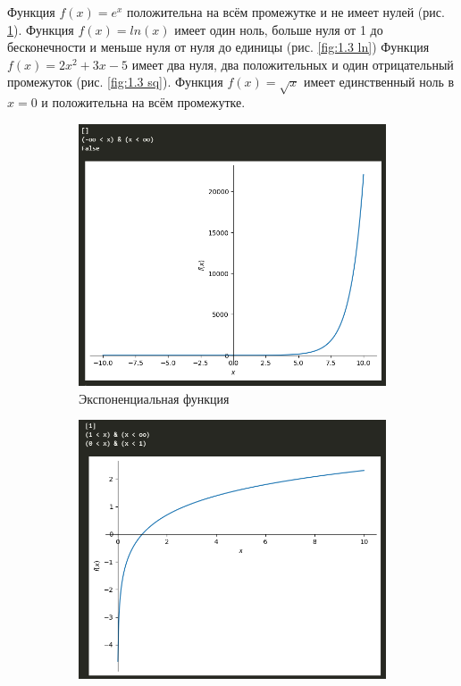 \documentclass[14pt,a4paper]{extarticle}
\begin{document}
Функция $f(x)=e^x$ положительна на всём промежутке и не имеет нулей (рис. \ref{fig:1.3 exp}).
Функция $f(x)=ln(x)$ имеет один ноль, больше нуля от 1 до бесконечности
и меньше нуля от нуля до единицы (рис. \ref{fig:1.3 ln})
Функция $f(x)=2x^2+3x-5$ имеет два нуля, два положительных и один
отрицательный промежуток (рис. \ref{fig:1.3 sq}).
Функция $f(x)=\sqrt x$ имеет единственный ноль в $x=0$ и положительна на всём промежутке.

\newpage
\begin{figure}[h!]
    \begin{subfigure}{0.5\textwidth}
        \centering
        \includegraphics[width=0.9\linewidth]{figures//inftech//lab1/1.3-1.png}
        \caption{Экспоненциальная функция}
        \label{fig:1.3 exp}
    \end{subfigure}
    \begin{subfigure}{0.5\textwidth}
        \centering
        \includegraphics[width=0.9\linewidth]{figures//inftech//lab1/1.3 ln.png}

\end{subfigure}
\end{figure}
\end{document}
